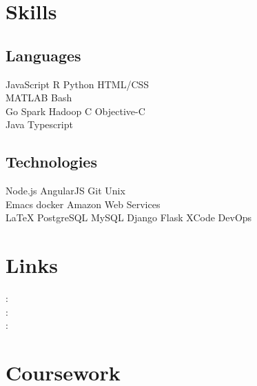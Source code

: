 \documentclass[]{deedy-resume-openfont}
\begin{document}
\begin{minipage}[t]{0.33\textwidth}
\section{Skills}
\subsection{Languages}
JavaScript \textbullet{} R \textbullet{} Python \textbullet{} HTML/CSS \\
MATLAB \textbullet{} Bash\\
Go \textbullet{} Spark \textbullet{} Hadoop \textbullet{} C \textbullet{} Objective-C \\
Java \textbullet{} Typescript\\
\sectionsep

\subsection{Technologies}
Node.js \textbullet{} AngularJS \textbullet{} Git \textbullet{} Unix \\
Emacs \textbullet{} docker \textbullet{} Amazon Web Services\\
LaTeX \textbullet{} PostgreSQL \textbullet{} MySQL
Django \textbullet{} Flask \textbullet{} XCode \textbullet{} DevOps
\sectionsep


\section{Links}
: \href{https://github.com/prajnak}{} \\
: \href{https://www.linkedin.com/in/prajnak}{} \\
:  \href{https://prajis.me}{} \\
\sectionsep


\section{Coursework}

\end{minipage}
\end{document}

